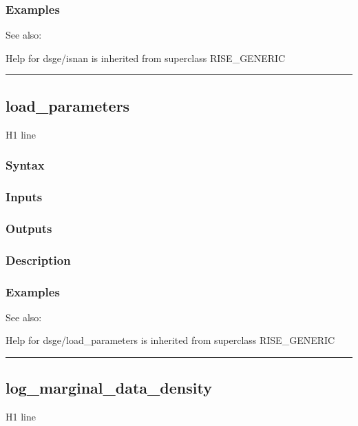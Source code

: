 \documentclass[letterpaper,10pt,english]{sphinxmanual}
\begin{document}
\subsubsection{Examples}
\label{classes/models/@dsge/dsge:id79}
See also:

Help for dsge/isnan is inherited from superclass RISE\_GENERIC


\bigskip\hrule{}\bigskip



\subsection{load\_parameters}
\label{classes/models/@dsge/dsge:id80}\label{classes/models/@dsge/dsge:load-parameters}
H1 line


\subsubsection{Syntax}
\label{classes/models/@dsge/dsge:id81}

\subsubsection{Inputs}
\label{classes/models/@dsge/dsge:id82}

\subsubsection{Outputs}
\label{classes/models/@dsge/dsge:id83}

\subsubsection{Description}
\label{classes/models/@dsge/dsge:id84}

\subsubsection{Examples}
\label{classes/models/@dsge/dsge:id85}
See also:

Help for dsge/load\_parameters is inherited from superclass RISE\_GENERIC


\bigskip\hrule{}\bigskip



\subsection{log\_marginal\_data\_density}
\label{classes/models/@dsge/dsge:log-marginal-data-density}\label{classes/models/@dsge/dsge:id86}
H1 line
\end{document}
